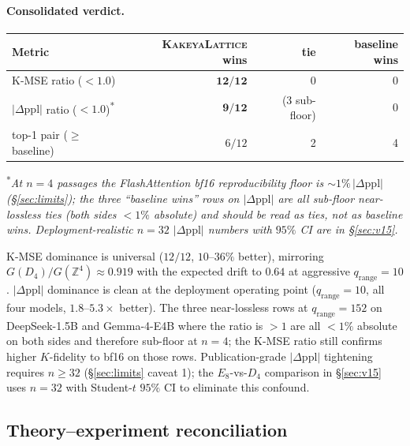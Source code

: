 \documentclass[10pt,a4paper]{article}
\theoremstyle{definition}
\theoremstyle{plain}
\newcommand{\Z}{\mathbb{Z}}
\newcommand{\abs}[1]{\left\lvert#1\right\rvert}
\begin{document}
\paragraph{Consolidated verdict.}

\begin{table}[H]
\centering
\small
\begin{tabular}{lrrr}
  \toprule
  Metric & \textsc{KakeyaLattice} wins & tie & baseline wins \\
  \midrule
  K-MSE ratio ($<1.0$)                & $\mathbf{12/12}$ & 0 & 0 \\
  $\abs{\Delta\text{ppl}}$ ratio ($<1.0$)\textsuperscript{*} & $\mathbf{9/12}$  & (3 sub-floor) & 0 \\
  top-1 pair ($\geq$ baseline)        & $6/12$  & 2 & 4 \\
  \bottomrule
\end{tabular}
\end{table}

\textsuperscript{*}\emph{At $n = 4$ passages the
FlashAttention bf16 reproducibility floor is
$\sim\!1\%\,|\Delta\mathrm{ppl}|$ (\S\ref{sec:limits}); the three
``baseline wins'' rows on $|\Delta\mathrm{ppl}|$ are all
sub-floor near-lossless ties (both sides $< 1\%$ absolute) and
should be read as ties, not as baseline wins. Deployment-realistic
$n=32$ $|\Delta\mathrm{ppl}|$ numbers with $95\%$ CI are in
\S\ref{sec:v15}.}

K-MSE dominance is universal ($12/12$, $10$--$36\%$ better),
mirroring $G(D_4)/G(\Z^4) \approx 0.919$ with the expected drift
to $0.64$ at aggressive $q_\mathrm{range}=10$.
$\abs{\Delta\text{ppl}}$ dominance is clean at the deployment
operating point ($q_\mathrm{range}=10$, all four models,
$1.8$--$5.3\times$ better). The three near-lossless rows at
$q_\mathrm{range}=152$ on DeepSeek-1.5B and Gemma-4-E4B where the
ratio is $> 1$ are all $< 1\%$ absolute on both sides and
therefore sub-floor at $n=4$; the K-MSE ratio still confirms
higher $K$-fidelity to bf16 on those rows. Publication-grade
$|\Delta\mathrm{ppl}|$ tightening requires $n \geq 32$
(\S\ref{sec:limits} caveat 1); the $E_8$-vs-$D_4$ comparison in
\S\ref{sec:v15} uses $n = 32$ with Student-$t$ $95\%$ CI to
eliminate this confound.

\subsection{Theory--experiment reconciliation}
\label{sec:bench-theory}
\end{document}
